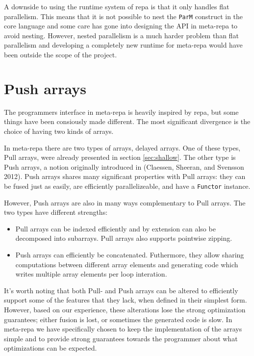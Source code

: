 \documentclass[preprint]{sigplanconf}
\begin{document}
A downside to using the runtime system of repa is that it only handles
flat parallelism. This means that it is not possible to nest the
\texttt{ParM} construct in the core language and some care has gone into
designing the API in meta-repa to avoid nesting. However, nested
parallelism is a much harder problem than flat parallelism and
developing a completely new runtime for meta-repa would have been
outside the scope of the project.

\section{Push arrays}

\label{sec:push}

The programmers interface in meta-repa is heavily inspired by repa, but
some things have been consiously made different. The most significant
divergence is the choice of having two kinds of arrays.

In meta-repa there are two types of arrays, delayed arrays. One of these
types, Pull arrays, were already presented in section \ref{sec:shallow}.
The other type is Push arrays, a notion originally introduced in
(Claessen, Sheeran, and Svensson 2012). Push arrays shares many
significant properties with Pull arrays: they can be fused just as
easily, are efficiently parallelizeable, and have a \texttt{Functor}
instance.

However, Push arrays are also in many ways complementary to Pull arrays.
The two types have different strengths:

\begin{itemize}
\item
  Pull arrays can be indexed efficiently and by extension can also be
  decomposed into subarrays. Pull arrays also supports pointwise
  zipping.
\item
  Push arrays can efficiently be concatenated. Futhermore, they allow
  sharing computations between different array elements and generating
  code which writes multiple array elements per loop interation.
\end{itemize}

It's worth noting that both Pull- and Push arrays can be altered to
efficiently support some of the features that they lack, when defined in
their simplest form. However, based on our experience, these alterations
lose the strong optimization guarantees; either fusion is lost, or
sometimes the generated code is slow. In meta-repa we have specifically
chosen to keep the implementation of the arrays simple and to provide
strong guarantees towards the programmer about what optimizations can be
expected.
\end{document}
